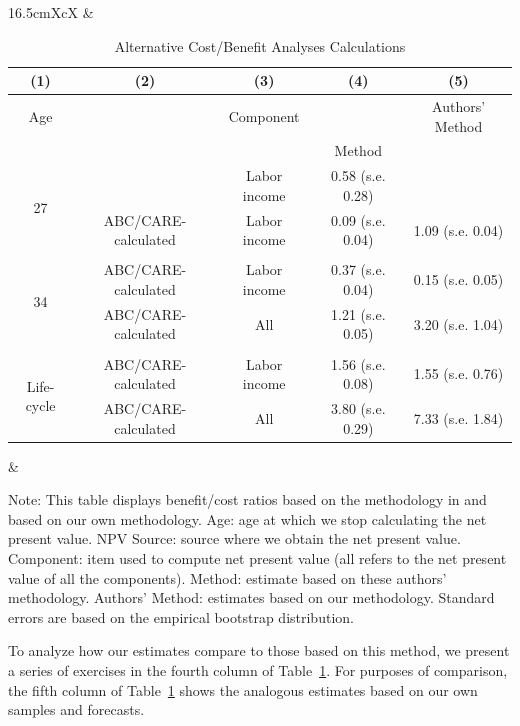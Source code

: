 \begin{table}[!htpb]
\begin{threeparttable}
\caption{Alternative Cost/Benefit Analyses Calculations}
\label{table:comparing}
\centering
\footnotesize
\begin{tabularx}{16.5cm}{XcX}
& \begin{tabular}{ccccc}
\toprule
(1) & (2) & (3) & (4) & (5)\\ \midrule
Age & \mc{1}{c}{NPV Source} & Component & \citet{Kline_Walters_2016_QJE} & Authors' Method \\
& & & Method & \\ \midrule
\multirow{2}{*}{27} & \cite{Chetty_Friedman_etal_2011_QJoE} & Labor income & 0.58 (s.e. 0.28) &  \\
& ABC/CARE-calculated & Labor income & 0.09 (s.e. 0.04) &  1.09 (s.e. 0.04)\\ \\
\multirow{2}{*}{34} & ABC/CARE-calculated & Labor income & 0.37 (s.e. 0.04) & 0.15 (s.e. 0.05) \\
& ABC/CARE-calculated & All & 1.21 (s.e. 0.05) &  3.20 (s.e. 1.04) \\ \\
\multirow{2}{*}{Life-cycle} &  ABC/CARE-calculated & Labor income & 1.56 (s.e. 0.08) & 1.55 (s.e. 0.76) \\
& ABC/CARE-calculated & All & 3.80 (s.e. 0.29) & 7.33 (s.e. 1.84) \\
\bottomrule
\end{tabular}
& 
\end{tabularx}
\begin{tablenotes}
\footnotesize
\item Note: This table displays benefit/cost ratios based on the methodology in \citet{Kline_Walters_2016_QJE} and based on our own methodology. Age: age at which we stop calculating the net present value. NPV Source: source where we obtain the net present value. Component: item used to compute net present value (all refers to the net present value of all the components). \citet{Kline_Walters_2016_QJE} Method: estimate based on these authors' methodology. Authors' Method: estimates based on our methodology. Standard errors are based on the empirical bootstrap distribution.
\end{tablenotes}
\end{threeparttable}
\end{table}

To analyze how our estimates compare to those based on this method, we present a series of exercises in the fourth column of Table~\ref{table:comparing}. For purposes of comparison, the fifth column of Table~\ref{table:comparing} shows the analogous estimates based on our own samples and forecasts.

